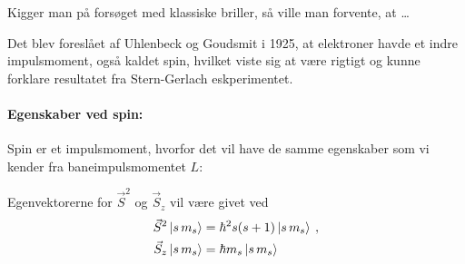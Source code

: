 Kigger man på forsøget med klassiske briller, så ville man forvente, at \ldots


Det blev foreslået af Uhlenbeck og Goudsmit i 1925, at elektroner havde et indre impulsmoment, også kaldet spin, hvilket viste sig at være rigtigt og kunne forklare resultatet fra Stern-Gerlach eskperimentet.

\paragraph{Egenskaber ved spin:} Spin er et impulsmoment, hvorfor det vil have de samme egenskaber som vi kender fra baneimpulsmomentet $L$:

Egenvektorerne for $\Vec{S}^2$ og $\Vec{S}_z$ vil være givet ved
\begin{align}
    \Vec{S}^2\ket{s \, m_s} &= \hbar^2 s(s+1) \ket{s \, m_s} \label{eq:Q08_EgenvektorligningForS^2} \: , \\
    \Vec{S}_z\ket{s \, m_s} &= \hbar m_s \ket{s \, m_s} \label{eq:Q08_EgenvektorligningForS_z}
\end{align}